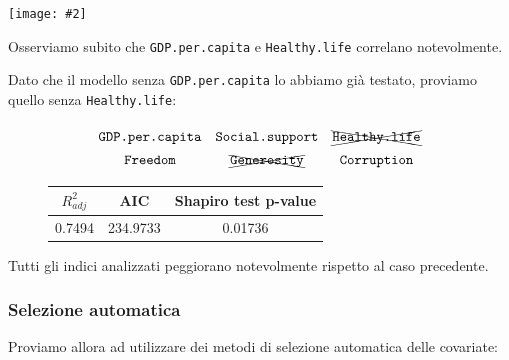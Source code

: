 \documentclass{beamer}
\newcommand{\fg}[2]{%
  \begin{center}
      \texttt{[image: \#2]}%
  \end{center}
}
\begin{document}
\begin{frame}
    \fg{1}{corrplot}
\end{frame}

\begin{frame}
    Osserviamo subito che \texttt{GDP.per.capita} e \texttt{Healthy.life} correlano notevolmente.

    \bigskip

    Dato che il modello senza \texttt{GDP.per.capita} lo abbiamo già testato, proviamo quello senza \texttt{Healthy.life}:
\end{frame}

\begin{frame}
    \begin{equation*}
    {\renewcommand*{\arraystretch}{1.4}
    \begin{array}{ccc}
    {\texttt{GDP.per.capita}} & {\texttt{Social.support}} & \xcancel{\texttt{Healthy.life}} \\
    {\texttt{Freedom}}        & \xcancel{\texttt{Generosity}}     & {\texttt{Corruption}}
    \end{array}}
    \end{equation*}

    \begin{figure}[h]
    \centering
    {\renewcommand\arraystretch{1.6}
    \begin{tabular}{|c|c|c|}
    \hline
    $R^2_{adj}$ & AIC & Shapiro test p-value \\
    \hline
    0.7494   & 234.9733 & 0.01736 \\
    \hline
    \end{tabular}}
    \end{figure}

    Tutti gli indici analizzati peggiorano notevolmente rispetto al caso precedente.
\end{frame}

\begin{frame}
    \frametitle{Selezione automatica}
    Proviamo allora ad utilizzare dei metodi di selezione automatica delle covariate:
\end{frame}
\end{document}
